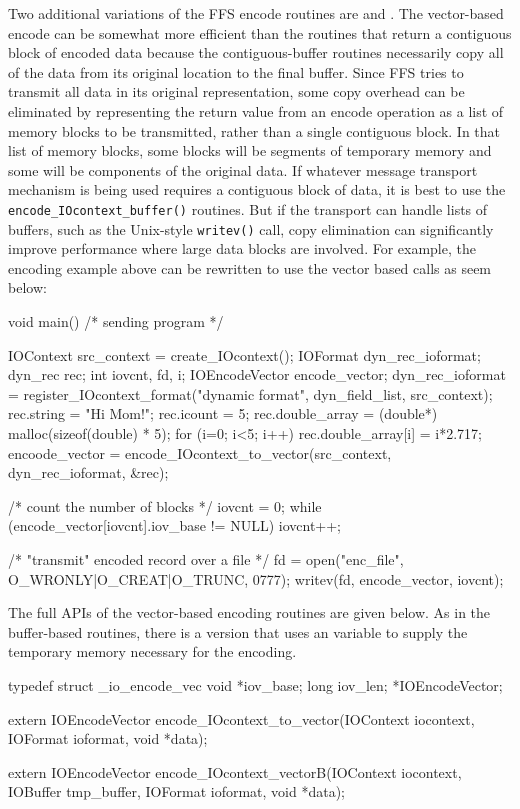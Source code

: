 Two additional variations of the FFS encode routines are
 and
.  The vector-based encode can be
somewhat more efficient than the routines that return a contiguous block of
encoded data because the contiguous-buffer routines necessarily copy all of
the data from its original location to the final buffer.  Since FFS tries
to transmit all data in its original representation, some copy overhead can
be eliminated by representing the return value from an encode operation as a
list of memory blocks to be transmitted, rather than a single contiguous
block.  In that list of memory blocks, some blocks will be segments of 
temporary memory and some will be components of the original data.
If whatever message transport mechanism is being used requires a contiguous
block of data, it is best to use the {\tt encode\_IOcontext\_buffer()}
routines.  But if the transport can handle lists of buffers, such as the
Unix-style {\tt writev()} call, copy elimination can significantly improve
performance where large data blocks are involved.  For example, the encoding
example above can be rewritten to use the vector based calls as seem below:
\begin{Code}
void main()     /* sending program */
{
    IOContext src_context = create_IOcontext();
    IOFormat dyn_rec_ioformat;
    dyn_rec rec;
    int iovcnt, fd, i;
    IOEncodeVector encode_vector;
    dyn_rec_ioformat = register_IOcontext_format("dynamic format",
                                                  dyn_field_list,
                                                  src_context);
    rec.string = "Hi Mom!";
    rec.icount = 5;
    rec.double_array = (double*) malloc(sizeof(double) * 5);
    for (i=0; i<5; i++) 
        rec.double_array[i] = i*2.717;
    encoode_vector = encode_IOcontext_to_vector(src_context, 
                        dyn_rec_ioformat, &rec);

    /* count the number of blocks */
    iovcnt = 0;
    while (encode_vector[iovcnt].iov_base != NULL) iovcnt++;

    /* "transmit" encoded record over a file */
    fd = open("enc_file", O_WRONLY|O_CREAT|O_TRUNC, 0777);
    writev(fd, encode_vector, iovcnt);
}
\end{Code}
The full APIs of the vector-based encoding routines are given below.  As in
the buffer-based routines, there is a version that uses an
 variable to supply the temporary memory necessary for the
encoding. 
\begin{WrapCode}
typedef struct _io_encode_vec {
     void *iov_base;
     long  iov_len;
} *IOEncodeVector;

extern IOEncodeVector
encode_IOcontext_to_vector(IOContext iocontext, IOFormat ioformat, void *data);

extern IOEncodeVector
encode_IOcontext_vectorB(IOContext iocontext, IOBuffer tmp_buffer, IOFormat ioformat, void *data);
\end{WrapCode}


